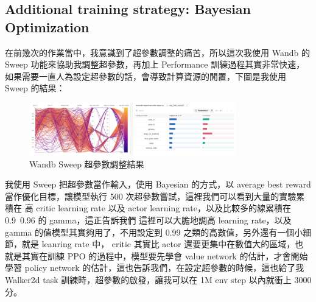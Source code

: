\clearpage
\subsection{Additional training strategy: Bayesian Optimization}

在前幾次的作業當中，我意識到了超參數調整的痛苦，所以這次我使用 Wandb 的 Sweep 功能來協助我調整超參數，再加上 Performance 訓練過程其實非常快速，如果需要一直人為設定超參數的話，會導致計算資源的閒置，下圖是我使用 Sweep 的結果：

\begin{figure}[h]
    \centering
    \includegraphics[width=0.8\textwidth]{figures/Sweep Case.png}
    \caption{Wandb Sweep 超參數調整結果}
    \label{fig:sweep_case}
\end{figure}

我使用 Sweep 把超參數當作輸入，使用 Bayesian 的方式，以 average best reward 當作優化目標，讓模型執行 500 次超參數嘗試，這裡我們可以看到大量的實驗累積在 高 critic learning rate 以及 actor learning rate，以及比較多的線累積在 0.9~0.96 的 gamma，這正告訴我們 這裡可以大膽地調高 learning rate，以及 gamma 的值模型其實夠用了，不用設定到 0.99 之類的高數值，另外還有一個小細節，就是 leanring rate 中， critic 其實比 actor 還要更集中在數值大的區域，也就是其實在訓練 PPO 的過程中，模型要先學會 value network 的估計，才會開始學習 policy network 的估計，這也告訴我們，在設定超參數的時候，這也給了我 Walker2d task 訓練時，超參數的啟發，讓我可以在 1M env step 以內就衝上 3000 分。